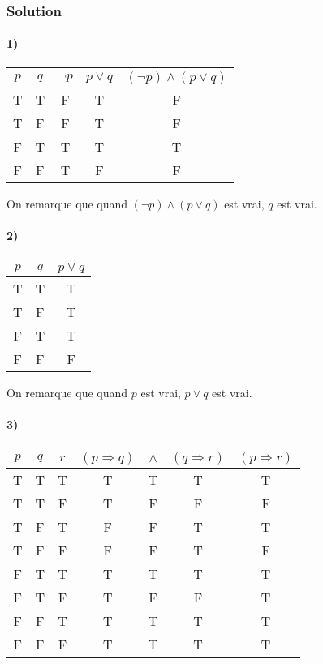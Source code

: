     \subsubsection*{Solution}
    
    \paragraph{1)}
    \begin{center}
	\begin{tabular}{cc|ccc}
		$p$ & $q$ & $\lnot p$ & $p \lor q$ & $(\lnot p) \land (p \lor q)$ \\
		\hline
		T&T&F&T&F\\
		T&F&F&T&F\\
		F&\color{red}T&T&T&\color{red}T\\
		F&F&T&F&F\\
	\end{tabular}
    \end{center}
    
    On remarque que quand $(\lnot p) \land (p \lor q)$ est vrai, $q$ est vrai.
    
    \paragraph{2)}
    \begin{center}
    	\begin{tabular}{cc|c}
    		$p$ & $q$ & $p \lor q$ \\
    		\hline
    		\color{red}T&T&\color{red}T\\
    		\color{red}T&F&\color{red}T\\
    		F&T&T\\
    		F&F&F\\
    	\end{tabular}
    \end{center}
    
    On remarque que quand $p$ est vrai, $p \lor q$ est vrai.
    
    \paragraph{3)}
    \begin{center}
    	\begin{tabular}{ccc|cccc}
    		$p$ & $q$ & $r$ & $(p \Rightarrow q)$ & $\land$ & $(q \Rightarrow r)$ & $(p \Rightarrow r)$ \\
    		\hline
    		T&T&T&T&\color{red}T&T&\color{red}T\\
    		T&T&F&T&F&F&F\\
    		T&F&T&F&F&T&T\\
    		T&F&F&F&F&T&F\\
    		F&T&T&T&\color{red}T&T&\color{red}T\\
    		F&T&F&T&F&F&T\\
    		F&F&T&T&\color{red}T&T&\color{red}T\\
    		F&F&F&T&\color{red}T&T&\color{red}T\\
    	\end{tabular}
    \end{center}
    
